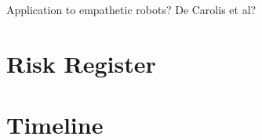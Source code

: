 \documentclass[]{article}
\begin{document}
Application to empathetic robots? De Carolis et al? 


\section{Risk Register}

\section{Timeline}



\end{document}
